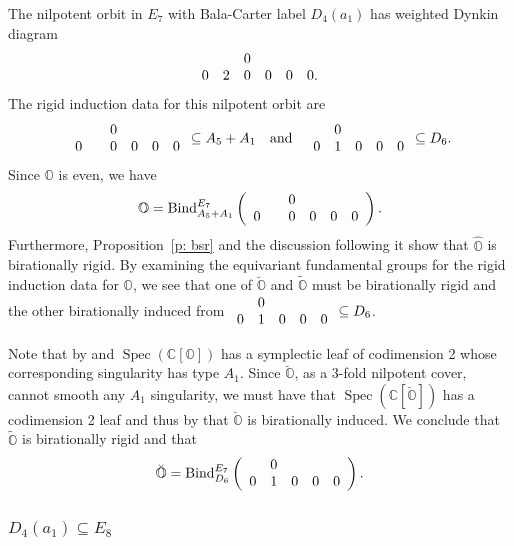 \documentclass[11pt]{amsart}
\newcommand{\C}{{\mathbb C}}
\renewcommand{\O}{{\mathbb O}}
\newcommand{\Spec}{\operatorname{Spec}}
\newcommand{\BInd}{{{\mbox{\rm Bind}}}}
\newcommand{\covO}{\widetilde{\O}}
\newcommand{\hatO}{\widehat{\O}}
\newcommand{\breveO}{\breve{\O}}
\numberwithin{equation}{section}
\begin{document}
	The nilpotent orbit in $E_7$ with Bala-Carter label $D_4(a_1)$ has weighted Dynkin diagram
	$$\begin{array}{c c c c c c}
		& & 0 & & & \\
		0 & 2 & 0 & 0 & 0 & 0.
	\end{array}$$
	The rigid induction data for this nilpotent orbit are 
	$$\begin{array}{c c c c c c}
		& & 0 & & & \\
		0 &  & 0 & 0 & 0 & 0 
	\end{array}\subseteq A_5+A_1\quad \mbox{and}\quad \begin{array}{c c c c c}
		& 0& &  &\\
		0 & 1 & 0 & 0 & 0\\
	\end{array}\subseteq D_6.$$
	Since $\O$ is even, we have $$\O=\BInd_{A_5 + A_1}^{E_7}\left(\begin{array}{c c c c c c}
		& & 0 & & & \\
		0 &  & 0 & 0 & 0 & 0 
	\end{array}\right).$$ Furthermore, Proposition~\ref{p: bsr} and the discussion following it show that $\hatO$ is birationally rigid. By examining the equivariant fundamental groups for the rigid induction data for $\O$, we see that one of $\breveO$ and $\covO$ must be birationally rigid and the other birationally induced from $\begin{array}{c c c c c}
		& 0 & &  &\\
		0 & 1 & 0 & 0 & 0\\
	\end{array}\subseteq D_6$. 
	
	Note that by \cite{FJLS} and \cite[Lemma 3.2.2]{MM} $\Spec(\C[\O])$ has a symplectic leaf of codimension 2 whose corresponding singularity has type $A_1$. Since $\breveO$, as a 3-fold nilpotent cover, cannot smooth any $A_1$ singularity, we must have that $\Spec(\C[\breveO])$ has a codimension 2 leaf and thus by \cite[Corollary 7.6.1]{LMM} that $\breveO$ is birationally induced. We conclude that $\covO$ is birationally rigid and that $$\breveO=\BInd_{D_6}^{E_7}\left( \begin{array}{c c c c c}
		& 0 &  &  &\\
		0 & 1 & 0 & 0 & 0\\
	\end{array} \right).$$ 
	
	
	\subsubsection{\texorpdfstring{$D_4(a_1)\subseteq E_8$}{D4a1 in E8}}\label{sss: D4a1 in E8}
	
\end{document}
